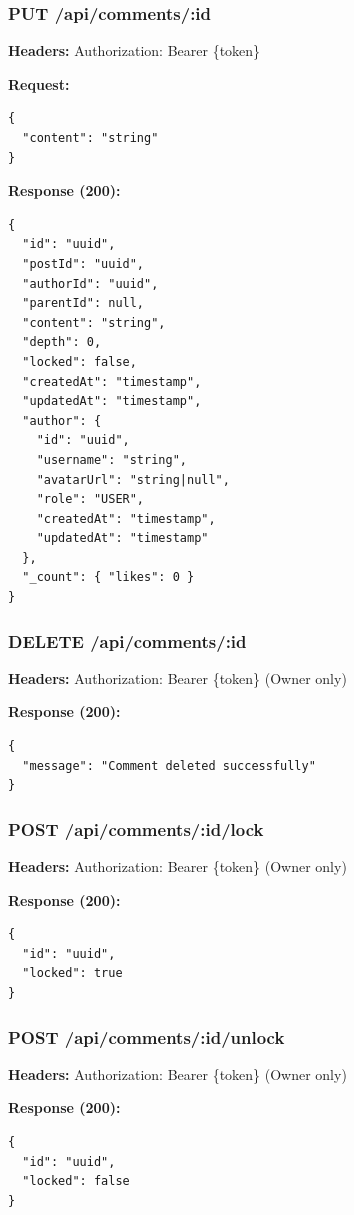 \documentclass[11pt,a4paper]{article}
\begin{document}
\subsubsection{PUT /api/comments/:id}
\textbf{Headers:} Authorization: Bearer \{token\}

\textbf{Request:}
\begin{lstlisting}
{
  "content": "string"
}
\end{lstlisting}

\textbf{Response (200):}
\begin{lstlisting}
{
  "id": "uuid",
  "postId": "uuid",
  "authorId": "uuid",
  "parentId": null,
  "content": "string",
  "depth": 0,
  "locked": false,
  "createdAt": "timestamp",
  "updatedAt": "timestamp",
  "author": {
    "id": "uuid",
    "username": "string",
    "avatarUrl": "string|null",
    "role": "USER",
    "createdAt": "timestamp",
    "updatedAt": "timestamp"
  },
  "_count": { "likes": 0 }
}
\end{lstlisting}

\subsubsection{DELETE /api/comments/:id}
\textbf{Headers:} Authorization: Bearer \{token\} (Owner only)

\textbf{Response (200):}
\begin{lstlisting}
{
  "message": "Comment deleted successfully"
}
\end{lstlisting}

\subsubsection{POST /api/comments/:id/lock}
\textbf{Headers:} Authorization: Bearer \{token\} (Owner only)

\textbf{Response (200):}
\begin{lstlisting}
{
  "id": "uuid",
  "locked": true
}
\end{lstlisting}

\subsubsection{POST /api/comments/:id/unlock}
\textbf{Headers:} Authorization: Bearer \{token\} (Owner only)

\textbf{Response (200):}
\begin{lstlisting}
{
  "id": "uuid",
  "locked": false
}
\end{lstlisting}
\end{document}
